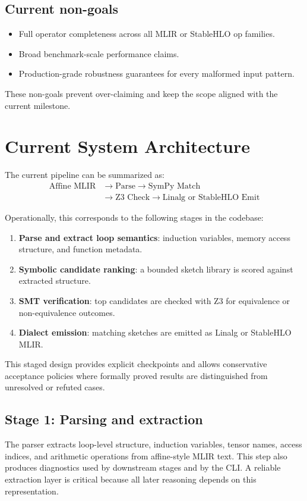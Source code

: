 \documentclass[conference]{IEEEtran}
\begin{document}
\subsection{Current non-goals}
\begin{itemize}
\item Full operator completeness across all MLIR or StableHLO op families.
\item Broad benchmark-scale performance claims.
\item Production-grade robustness guarantees for every malformed input pattern.
\end{itemize}
These non-goals prevent over-claiming and keep the scope aligned with the current milestone.

\section{Current System Architecture}
The current pipeline can be summarized as:
\begin{equation}
\begin{aligned}
\text{Affine MLIR} &\rightarrow \text{Parse} \rightarrow \text{SymPy Match} \\
&\rightarrow \text{Z3 Check} \rightarrow \text{Linalg or StableHLO Emit}
\end{aligned}
\end{equation}

Operationally, this corresponds to the following stages in the codebase:
\begin{enumerate}
\item \textbf{Parse and extract loop semantics}: induction variables, memory access structure, and function metadata.
\item \textbf{Symbolic candidate ranking}: a bounded sketch library is scored against extracted structure.
\item \textbf{SMT verification}: top candidates are checked with Z3 for equivalence or non-equivalence outcomes.
\item \textbf{Dialect emission}: matching sketches are emitted as Linalg or StableHLO MLIR.
\end{enumerate}

This staged design provides explicit checkpoints and allows conservative acceptance policies where formally proved results are distinguished from unresolved or refuted cases.

\subsection{Stage 1: Parsing and extraction}
The parser extracts loop-level structure, induction variables, tensor names, access indices, and arithmetic operations from affine-style MLIR text. This step also produces diagnostics used by downstream stages and by the CLI. A reliable extraction layer is critical because all later reasoning depends on this representation.
\end{document}
